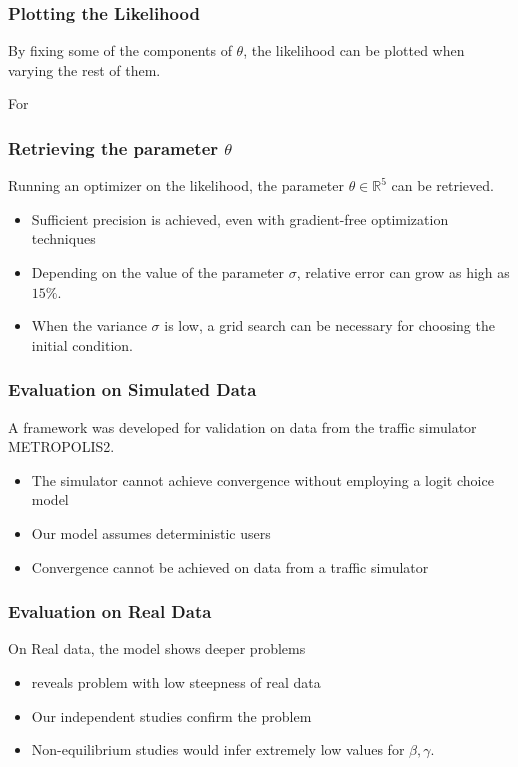 \documentclass[hyperref={pdfpagelabels=false}]{beamer}
\begin{document}
\begin{frame}
  \frametitle{Plotting the Likelihood}
  By fixing some of the components of \(\theta\), the likelihood can be plotted when varying the rest of them.

  For 

  \centering
\end{frame}

\begin{frame}
  \frametitle{Retrieving the parameter \(\theta\)}
  Running an optimizer on the likelihood,
  the parameter \(\theta \in \mathbb{R}^5\) can be retrieved.
  \begin{itemize}
  \item Sufficient precision is achieved, even with gradient-free optimization techniques
  \item Depending on the value of the parameter \(\sigma\),
    relative error can grow as high as \(15\%\).
  \item When the variance \(\sigma\) is low, a grid search can be necessary for choosing the initial condition.
  \end{itemize}
\end{frame}

\begin{frame}
  \frametitle{Evaluation on Simulated Data}
  A framework was developed for validation on data from the traffic simulator METROPOLIS2.
  \begin{itemize}
  \item The simulator cannot achieve convergence without employing a logit choice model
  \item Our model assumes deterministic users
  \item Convergence cannot be achieved on data from a traffic simulator
  \end{itemize}
\end{frame}

\begin{frame}
  \frametitle{Evaluation on Real Data}
  On Real data, the model shows deeper problems
  \begin{itemize}
  \item \textcite{https://doi.org/10.1111/iere.12692} reveals problem with low steepness of real data
  \item Our independent studies confirm the problem
  \item Non-equilibrium studies would infer extremely low values for \(\beta, \gamma\).
  \end{itemize}
\end{frame}
\end{document}
